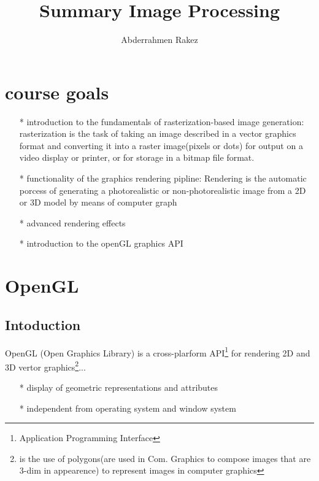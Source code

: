 \documentclass[12pt, a4paper]{article}
\title{Summary Image Processing}
\author{Abderrahmen Rakez}
\date{}
\begin{document}
\maketitle

\section{course goals}
\begin{itemize}
  \item[*] introduction to the fundamentals of rasterization-based image generation: rasterization is the task of taking an image described in a vector graphics format and converting it into
  a raster image(pixels or dots) for output on a video display or printer, or for storage in a bitmap file format.
  \item[*] functionality of the graphics rendering pipline: Rendering is the automatic porcess of generating a photorealistic or non-photorealistic image
  from a 2D or 3D model by means of computer graph
  \item[*] advanced rendering effects
  \item[*] introduction to the openGL graphics API
\end{itemize}

\section{OpenGL}
\subsection{Intoduction}
OpenGL (Open Graphics Library) is a cross-plarform API\footnote{Application Programming Interface} for rendering 2D and 3D vertor graphics\footnote{is the use of polygons(are used in Com.
Graphics to compose images that are 3-dim in appearence) to represent images in computer graphics}...
\begin{itemize}
  \item[*] display of geometric representations and attributes
  \item[*] independent from operating system and window system
\end{itemize}
\end{document}
